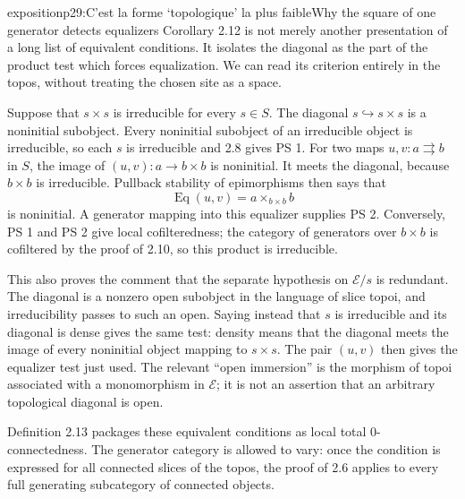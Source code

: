 \begin{dcomment}{exposition}{p29:C'est la forme `topologique' la plus faible}{Why the square of one generator detects equalizers}
Corollary 2.12 is not merely another presentation of a long list of equivalent conditions. It isolates the diagonal as the part of the product test which forces equalization. We can read its criterion entirely in the topos, without treating the chosen site as a space.

Suppose that $s\times s$ is irreducible for every $s\in S$. The diagonal $s\hookrightarrow s\times s$ is a noninitial subobject. Every noninitial subobject of an irreducible object is irreducible, so each $s$ is irreducible and 2.8 gives PS 1. For two maps $u,v:a\rightrightarrows b$ in $S$, the image of $(u,v):a\to b\times b$ is noninitial. It meets the diagonal, because $b\times b$ is irreducible. Pullback stability of epimorphisms then says that
\[
 \operatorname{Eq}(u,v)=a\times_{b\times b}b
\]
is noninitial. A generator mapping into this equalizer supplies PS 2. Conversely, PS 1 and PS 2 give local cofilteredness; the category of generators over $b\times b$ is cofiltered by the proof of 2.10, so this product is irreducible.

This also proves the comment that the separate hypothesis on $\mathcal E/s$ is redundant. The diagonal is a nonzero open subobject in the language of slice topoi, and irreducibility passes to such an open. Saying instead that $s$ is irreducible and its diagonal is dense gives the same test: density means that the diagonal meets the image of every noninitial object mapping to $s\times s$. The pair $(u,v)$ then gives the equalizer test just used. The relevant ``open immersion'' is the morphism of topoi associated with a monomorphism in $\mathcal E$; it is not an assertion that an arbitrary topological diagonal is open.

Definition 2.13 packages these equivalent conditions as local total $0$-connectedness. The generator category is allowed to vary: once the condition is expressed for all connected slices of the topos, the proof of 2.6 applies to every full generating subcategory of connected objects.
\end{dcomment}

